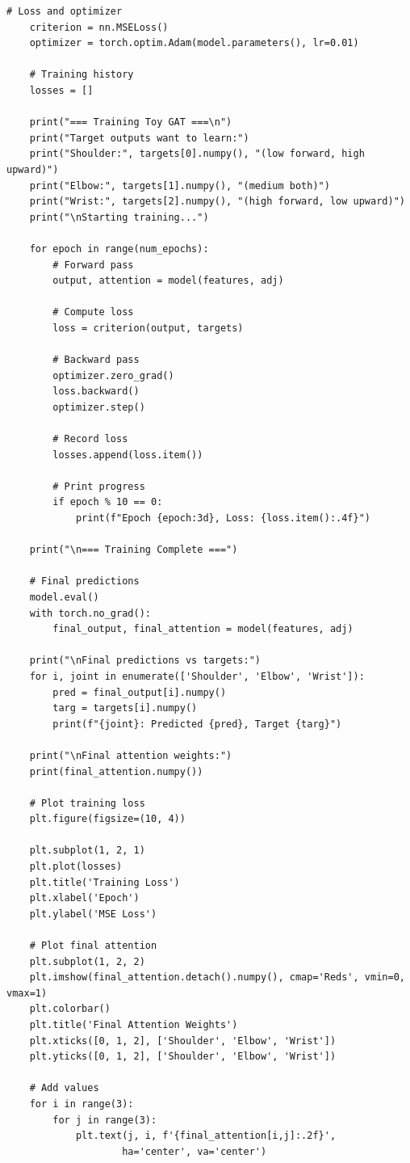\begin{lstlisting}[style=pythonstyle,title={Toy problem with fake training},label={code:toy_problem_with_fake_training}]
    # Loss and optimizer
    criterion = nn.MSELoss()
    optimizer = torch.optim.Adam(model.parameters(), lr=0.01)
    
    # Training history
    losses = []
    
    print("=== Training Toy GAT ===\n")
    print("Target outputs want to learn:")
    print("Shoulder:", targets[0].numpy(), "(low forward, high upward)")
    print("Elbow:", targets[1].numpy(), "(medium both)")
    print("Wrist:", targets[2].numpy(), "(high forward, low upward)")
    print("\nStarting training...")
    
    for epoch in range(num_epochs):
        # Forward pass
        output, attention = model(features, adj)
        
        # Compute loss
        loss = criterion(output, targets)
        
        # Backward pass
        optimizer.zero_grad()
        loss.backward()
        optimizer.step()
        
        # Record loss
        losses.append(loss.item())
        
        # Print progress
        if epoch % 10 == 0:
            print(f"Epoch {epoch:3d}, Loss: {loss.item():.4f}")
    
    print("\n=== Training Complete ===")
    
    # Final predictions
    model.eval()
    with torch.no_grad():
        final_output, final_attention = model(features, adj)
    
    print("\nFinal predictions vs targets:")
    for i, joint in enumerate(['Shoulder', 'Elbow', 'Wrist']):
        pred = final_output[i].numpy()
        targ = targets[i].numpy()
        print(f"{joint}: Predicted {pred}, Target {targ}")
    
    print("\nFinal attention weights:")
    print(final_attention.numpy())
    
    # Plot training loss
    plt.figure(figsize=(10, 4))
    
    plt.subplot(1, 2, 1)
    plt.plot(losses)
    plt.title('Training Loss')
    plt.xlabel('Epoch')
    plt.ylabel('MSE Loss')
    
    # Plot final attention
    plt.subplot(1, 2, 2)
    plt.imshow(final_attention.detach().numpy(), cmap='Reds', vmin=0, vmax=1)
    plt.colorbar()
    plt.title('Final Attention Weights')
    plt.xticks([0, 1, 2], ['Shoulder', 'Elbow', 'Wrist'])
    plt.yticks([0, 1, 2], ['Shoulder', 'Elbow', 'Wrist'])
    
    # Add values
    for i in range(3):
        for j in range(3):
            plt.text(j, i, f'{final_attention[i,j]:.2f}', 
                    ha='center', va='center')
    

\end{lstlisting}

